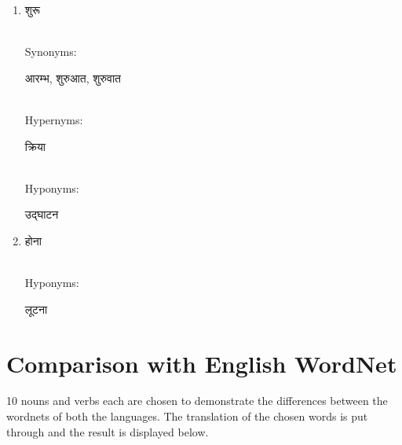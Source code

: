 \documentclass{article}
\begin{document}
\begin{enumerate}
\item \begin{hindi}शुरू\end{hindi} \\
Synonyms: \begin{hindi}आरम्भ, शुरुआत, शुरुवात\end{hindi} \\
Hypernyms: \begin{hindi}क्रिया\end{hindi} \\
Hyponyms: \begin{hindi}उद्घाटन\end{hindi}

\item \begin{hindi}होना\end{hindi} \\
Hyponyms: \begin{hindi}लूटना\end{hindi} 

\end{enumerate}

\section{Comparison with English WordNet}
10 nouns and verbs each are chosen to demonstrate the differences between the wordnets of both the languages. The translation of the chosen words is put through and the result is displayed below.
\end{document}
